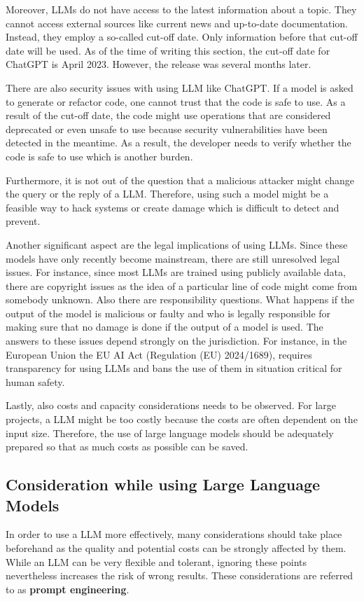 Moreover, \ac{LLM}s do not have access to the latest information about a topic. They cannot access external sources like current news and up-to-date documentation. Instead, they employ a so-called cut-off date. Only information before that cut-off date will be used. As of the time of writing this section, the cut-off date for ChatGPT is April  2023. However, the release was several months later.  

There are also security issues with using  \ac{LLM} like ChatGPT. If a model is asked to generate or refactor code, one cannot trust that the code is safe to use. As a result of the cut-off date, the code might use operations that are considered deprecated or even unsafe to use because security vulnerabilities have been detected in the meantime. As a result, the developer needs to verify whether the code is safe to use which is another burden.  \cite{pearce2021asleep}

Furthermore, it is not out of the question that a malicious attacker might change the query or the reply of a \ac{LLM}. Therefore, using such a model might be a feasible way to hack systems or create damage which is difficult to detect and prevent. \cite{not_what_you_signed_for}

Another significant aspect are the legal implications of using \acp{LLM}. Since these models have only recently become mainstream, there are still unresolved legal issues. For instance, since most \acp{LLM} are trained using publicly available data, there are copyright issues as the idea of a particular line of code might come from somebody unknown. Also there are responsibility questions. What happens if the output of the model is malicious or faulty and who is legally responsible for making sure that no damage is done if the output of a model is used. The answers to these issues depend strongly on the jurisdiction. For instance, in the European Union the EU AI Act (Regulation (EU) 2024/1689), requires  transparency for using \acp{LLM} and bans the use of them in situation critical for human safety.  \cite{eu-ai-act}


Lastly, also costs and capacity considerations needs to be observed. For large projects, a \ac{LLM} might be too costly because  the costs are often dependent on the input size. Therefore, the use of large language models should be adequately prepared so that as much costs as possible can be saved.  \cite{chen2023frugalgpt}




\subsection{Consideration while using Large Language Models}\label{sec:llm_considerations}
In order to use a \ac{LLM} more effectively, many considerations should take place beforehand as the quality and potential costs can be strongly affected by them. While an \ac{LLM} can be very flexible and tolerant, ignoring these points nevertheless increases the risk of wrong results. These considerations are  referred to as \textbf{prompt engineering}. 

